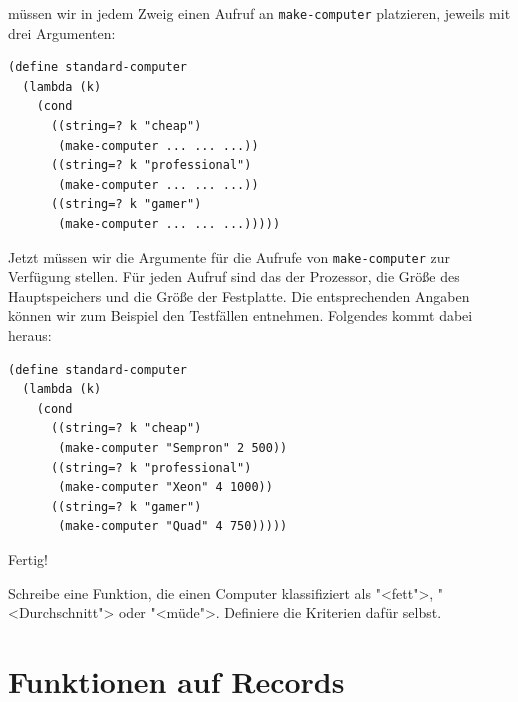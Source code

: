 müssen wir in jedem Zweig einen Aufruf an \texttt{make-computer}
platzieren, jeweils mit drei Argumenten:
%
\begin{verbatim}
(define standard-computer
  (lambda (k)
    (cond
      ((string=? k "cheap")
       (make-computer ... ... ...))
      ((string=? k "professional")
       (make-computer ... ... ...))
      ((string=? k "gamer")
       (make-computer ... ... ...)))))
\end{verbatim}
%
Jetzt müssen wir die Argumente für die Aufrufe von
\texttt{make-computer} zur Verfügung stellen.  Für jeden Aufruf sind
das der Prozessor, die Größe des Hauptspeichers und die
Größe der Festplatte.  Die entsprechenden Angaben können wir zum
Beispiel den Testfällen entnehmen.  Folgendes kommt dabei heraus:
%
\begin{verbatim}
(define standard-computer
  (lambda (k)
    (cond
      ((string=? k "cheap")
       (make-computer "Sempron" 2 500))
      ((string=? k "professional")
       (make-computer "Xeon" 4 1000))
      ((string=? k "gamer")
       (make-computer "Quad" 4 750)))))
\end{verbatim}
%
Fertig!

\begin{aufgabe}
  Schreibe eine Funktion, die einen Computer klassifiziert als
  "<fett">, "<Durchschnitt"> oder "<müde">.  Definiere die Kriterien
  dafür selbst.
\end{aufgabe}

\section{Funktionen auf Records}
\label{sec:funktionen-auf-records}


